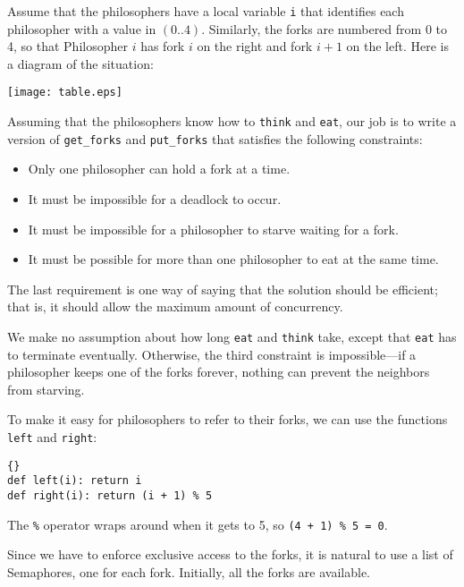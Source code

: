 \documentclass{book}
\begin{document}
Assume that the philosophers have a local variable {\tt i} that
identifies each philosopher with a value in $(0..4)$.  Similarly,
the forks are numbered from 0 to 4, so that Philosopher $i$ has
fork $i$ on the right and fork $i+1$ on
the left.  Here is a diagram of the situation:

\centerline{\texttt{[image: table.eps]}}

Assuming that the philosophers know how to {\tt think} and {\tt eat},
our job is to write a version of {\tt get\_forks} and {\tt put\_forks}
that satisfies the following constraints:

\begin{itemize}

\item Only one philosopher can hold a fork at a time.

\item It must be impossible for a deadlock to occur.

\item It must be impossible for a philosopher to starve waiting
for a fork.

\item It must be possible for more than one philosopher
to eat at the same time.

\end{itemize}

The last requirement is one way of saying that the solution
should be efficient; that is, it should allow the maximum amount
of concurrency.

We make no assumption about how long {\tt eat} and {\tt think} take,
except that {\tt eat} has to terminate eventually.  Otherwise, the
third constraint is impossible---if a philosopher keeps one of the
forks forever, nothing can prevent the neighbors from starving.

To make it easy for philosophers to refer to their forks,
we can use the functions {\tt left} and {\tt right}:

\begin{lstlisting}[title={Which fork?}]{}
def left(i): return i
def right(i): return (i + 1) % 5
\end{lstlisting}

The {\tt \%} operator wraps around when it gets to 5, so
{\tt (4 + 1) \% 5 = 0}.

Since we have to enforce exclusive access to the forks,
it is natural to use a list of Semaphores, one for
each fork.  Initially, all the forks are available.
\end{document}
